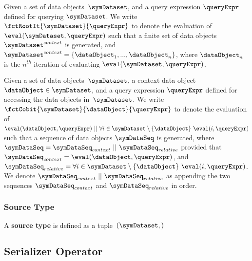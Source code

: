 \begin{definition}
	\label{def:root_iterator}
	Given a set of data objects~$\symDataset$, and a query expression $\queryExpr$
	defined for querying $\symDataset$.
	We write $\fctRootIt{\symDataset}{\queryExpr}$ to denote the
	evaluation of $\eval(\symDataset, \queryExpr)$ such that
	a finite set of data objects~$\symDataset^{context}$ is generated, and  $\symDataset^{context} =
		\{\dataObject_1, ... , \dataObject_n\}$, where $\dataObject_n$ is the
	$n^{th}$-iteration of evaluating $\eval(\symDataset, \queryExpr)$.
\end{definition}


\begin{definition}
	\label{def:cob_iterator}
	Given a set of data objects~$\symDataset$, a context data
	object~$\dataObject \in \symDataset$, and a query expression $\queryExpr$
	defined for accessing the data objects in~$\symDataset$.
	We write $\fctCobit{\symDataset}{\dataObject}{\queryExpr}$ to denote
	the evaluation of
	$\eval(\dataObject, \queryExpr)\ ||\ \forall i \in \symDataset \setminus \{ \dataObject \} \ \eval(i, \queryExpr)$
	such that a sequence of data objects $\symDataSeq$ is generated, where
	$\symDataSeq =  \symDataSeq_{context} \ || \ \symDataSeq_{relative}$
	provided that $\symDataSeq_{context} = \eval(\dataObject, \queryExpr)$, and
	$\symDataSeq_{relative} = \forall i \in \symDataset \setminus \{ \dataObject \} \ \eval(i, \queryExpr)$.
	We denote $\symDataSeq_{context} \ || \ \symDataSeq_{relative}$ as appending the
	two sequences $\symDataSeq_{context}$ and $\symDataSeq_{relative}$ in order.

\end{definition}

\subsubsection{Source Type}%
\label{ssub:source_type}
A \textbf{source type} is defined as a tuple~$(\symDataset, )$




\subsection{Serializer Operator}%
\label{sub:serializer_operator}


